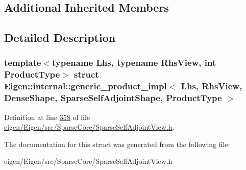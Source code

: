 \subsection*{Additional Inherited Members}


\subsection{Detailed Description}
\subsubsection*{template$<$typename Lhs, typename Rhs\+View, int Product\+Type$>$\newline
struct Eigen\+::internal\+::generic\+\_\+product\+\_\+impl$<$ Lhs, Rhs\+View, Dense\+Shape, Sparse\+Self\+Adjoint\+Shape, Product\+Type $>$}



Definition at line \hyperlink{eigen_2_eigen_2src_2_sparse_core_2_sparse_self_adjoint_view_8h_source_l00358}{358} of file \hyperlink{eigen_2_eigen_2src_2_sparse_core_2_sparse_self_adjoint_view_8h_source}{eigen/\+Eigen/src/\+Sparse\+Core/\+Sparse\+Self\+Adjoint\+View.\+h}.



The documentation for this struct was generated from the following file\+:\begin{DoxyCompactItemize}
\item 
eigen/\+Eigen/src/\+Sparse\+Core/\+Sparse\+Self\+Adjoint\+View.\+h\end{DoxyCompactItemize}
